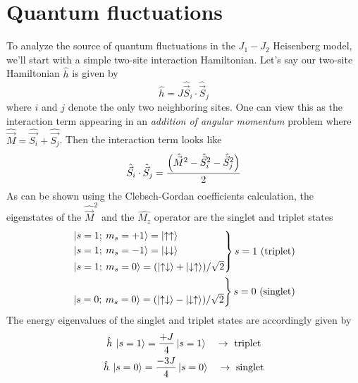 \documentclass[../thesis_main.tex]{subfiles}
\begin{document}
\section{Quantum fluctuations}
To analyze the source of quantum fluctuations in the $J_1-J_2$ Heisenberg model, we'll start with a simple two-site interaction Hamiltonian. Let's say our two-site Hamiltonian $\hat{h}$ is given by 
\begin{equation}
    \hat{h} = J \hat{\vec{S}}_i \cdot \hat{\vec{S}}_j
\end{equation}
where $i$ and $j$ denote the only two neighboring sites. One can view this as the interaction term appearing in an \textit{addition of angular momentum} problem where $\hat{\vec{M}} = \hat{\vec{S_i}} + \hat{\vec{S_j}}$. Then the interaction term looks like
\begin{equation}
    \hat{\vec{S}}_i \cdot \hat{\vec{S}}_j = \frac{\qty(\hat{\vec{M}}^2 -  \hat{\vec{S}}_i^2 - \hat{\vec{S}}_j^2)}{2}
\end{equation}
As can be shown using the Clebsch-Gordan coefficients calculation, the eigenstates of the $\hat{\vec{M}}^2$ and the $\hat{M_z}$ operator are the singlet and triplet states
\begin{subequations}
    \begin{align}
        \begin{rcases*}
            \ket{s = 1; \: m_s = +1} = \ket{\uparrow \uparrow} \\
            \ket{s = 1; \: m_s = -1} = \ket{\downarrow \downarrow} \\
            \ket{s = 1; \: m_s = 0} = (\ket{\uparrow \downarrow} + \ket{\downarrow \uparrow})/\sqrt{2}
            \end{rcases*} s=1\text{ (triplet)} \\
        \begin{rcases*}
            \\
            \ket{s = 0; \: m_s = 0} = (\ket{\uparrow \downarrow} - \ket{\downarrow \uparrow})/\sqrt{2}
            \\ 
            \end{rcases*} s=0\text{ (singlet)}
    \end{align}    
\end{subequations}
The energy eigenvalues of the singlet and triplet states are accordingly given by
\begin{subequations}
\begin{gather}
    \hat{h} \: \ket{s = 1} = \frac{+J}{4} \ket{s = 1} \quad \rightarrow \text{ triplet} \\
    \hat{h} \: \ket{s = 0} = \frac{-3J}{4} \ket{s = 0} \quad \rightarrow \text{ singlet}
\end{gather}
\end{subequations}
\end{document}
